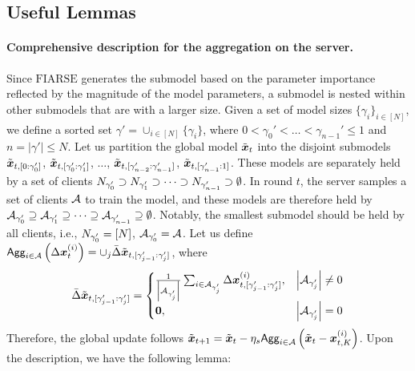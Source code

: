 \documentclass{article}
\theoremstyle{plain}
\theoremstyle{definition}
\theoremstyle{remark}
\newcommand{\algo}{\ensuremath{\text{FIARSE}}\xspace}
\newcommand{\bracket}[1]{\left(#1\right)}
\begin{document}
\subsection{Useful Lemmas} \label{subap:lemma}

\paragraph{Comprehensive description for the aggregation on the server.} Since \algo generates the submodel based on the parameter importance reflected by the magnitude of the model parameters, a submodel is nested within other submodels that are with a larger size. Given a set of model sizes $\{\gamma_i\}_{i \in [N]}$, we define a sorted set $\gamma' = \cup_{i \in [N]} \{\gamma_i\}$, where $0 < \gamma_0' < \dots < \gamma_{n-1}' \leq 1$ and $n = |\gamma'| \leq N$. Let us partition the global model $\x{t}$ into the disjoint submodels $\x{t, [0:\gamma_0']}$, $\x{t, [\gamma_0':\gamma_1']}$, $\dots$, $\x{t, [\gamma_{n-2}':\gamma_{n-1}']}$, $\x{t, [\gamma_{n-1}':1]}$. These models are separately held by a set of clients $N_{\gamma_{0}'} \supset N_{\gamma_{1}'} \supset \dots \supset N_{\gamma_{n-1}'} \supset \emptyset$. In round $t$, the server samples a set of clients $\mathcal{A}$ to train the model, and these models are therefore held by $\mathcal{A}_{\gamma_{0}'} \supseteq \mathcal{A}_{\gamma_{1}'} \supseteq \dots \supseteq \mathcal{A}_{\gamma_{n-1}'} \supseteq \emptyset$. Notably, the smallest submodel should be held by all clients, i.e., $N_{\gamma_{0}'} = [N]$, $\mathcal{A}_{\gamma_{0}'}=\mathcal{A}$.  Let us define $\agg{i \in \participant}\bracket{\Delta \x{i}{t}} = \cup_j \Bar{\Delta} \x{t, [\gamma_{j-1}':\gamma_{j}']}$, where  
\begin{equation} \label{eq:pt_avg}
\Bar{\Delta} \x{t, [\gamma_{j-1}':\gamma_{j}']} = \begin{cases}
        \frac{1}{\left|\a{j}\right|} \sum_{i \in \a{j}} \Delta \x{i}{t, [\gamma_{j-1}':\gamma_{j}']}, &\left|\a{j}\right| \neq 0 \\
        \boldsymbol{0}, &\left|\a{j}\right| = 0
    \end{cases}
\end{equation}
Therefore, the global update follows $\x{t+1} = \x{t} - \eta_s \textsf{Agg}_{i \in \mathcal{A}} \bracket{\x{t} - \x{i}{t}{K}}$. Upon the description, we have the following lemma:
\end{document}
